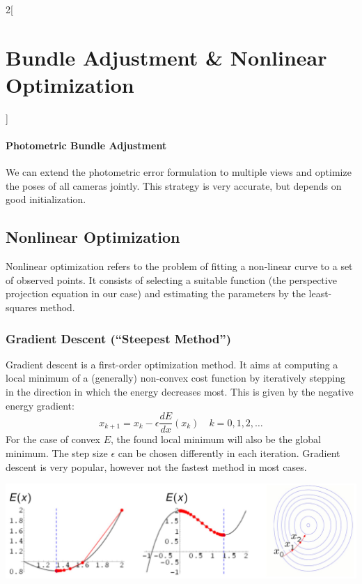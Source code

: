 \documentclass[oneside,fontsize=11pt,paper=a4]{scrartcl}
\newenvironment{myfigure}
  {\par\medskip\noindent\minipage{\linewidth}}
  {\endminipage\par\medskip}
\begin{document}
\begin{multicols}{2}[\section{Bundle Adjustment \& Nonlinear Optimization}]
\paragraph{Photometric Bundle Adjustment} We can extend the photometric error formulation to multiple views and optimize the poses of all cameras jointly. This strategy is very accurate, but depends on good initialization.

\subsection{Nonlinear Optimization}
Nonlinear optimization refers to the problem of fitting a non-linear curve to a set of observed points. It consists of selecting a suitable function (the perspective projection equation in our case) and estimating the parameters by the least-squares method.

\subsubsection{Gradient Descent (``Steepest Method'')}
Gradient descent is a first-order optimization method. It aims at computing a local minimum of a (generally) non-convex cost function by iteratively stepping in the direction in which the energy decreases most. This is given by the negative energy gradient:
\begin{equation*}
    x_{k+1} = x_k - \epsilon \frac{dE}{dx} (x_k) \quad k = 0, 1, 2, \ldots
\end{equation*}
For the case of convex $E$, the found local minimum will also be the global minimum. The step size $\epsilon$ can be chosen differently in each iteration. Gradient descent is very popular, however not the fastest method in most cases.

\begin{myfigure}
 \centering
 \includegraphics[width=1.0\linewidth]{Images/Gradient_descent.jpg}
\end{myfigure}


\end{multicols}
\end{document}
